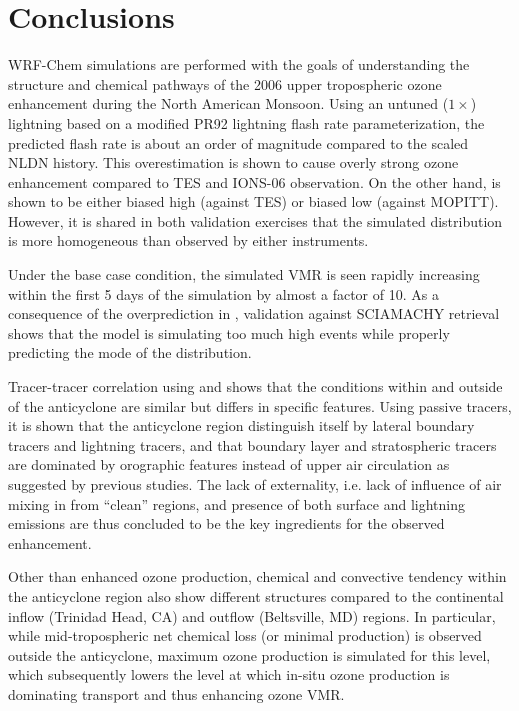 \newpage\section{Conclusions}\label{sec:2006/conslusion}

WRF-Chem simulations are performed with the goals of understanding the structure and chemical pathways of
the 2006 upper tropospheric ozone enhancement during the North American Monsoon. Using an untuned ($1\times$)
lightning based on a modified PR92 lightning flash rate parameterization, the predicted flash rate is about an order
of magnitude compared to the scaled NLDN history. This overestimation is shown to cause overly strong ozone
enhancement compared to TES and IONS-06 observation. On the other hand,  is shown to be either
biased high (against TES) or biased low (against MOPITT). However, it is shared in both validation exercises that
the simulated  distribution is more homogeneous than observed by either instruments.

Under the base case condition, the simulated  VMR is seen rapidly increasing within the first 5
days of the simulation by almost a factor of 10. As a consequence of the overprediction in {\lnox}, validation
against SCIAMACHY  retrieval shows that the model is simulating too much high 
events while properly predicting the mode of the distribution.

Tracer-tracer correlation using  and  shows that the conditions within and outside of the
anticyclone are similar but differs in specific features. Using passive tracers, it is shown that the anticyclone region
distinguish itself by lateral boundary tracers and lightning tracers, and that boundary layer and stratospheric tracers
are dominated by orographic features instead of upper air circulation as suggested by previous studies. The
lack of externality, i.e. lack of influence of air mixing in from ``clean'' regions, and presence of both surface and lightning
emissions are thus concluded to be the key ingredients for the observed enhancement.

Other than enhanced ozone production, chemical and convective tendency within the anticyclone region also
show different structures compared to the continental inflow (Trinidad Head, CA) and outflow (Beltsville, MD)
regions. In particular, while mid-tropospheric net chemical loss (or minimal production) is observed outside
the anticyclone, maximum ozone production is simulated for this level, which subsequently lowers the level
at which in-situ ozone production is dominating transport and thus enhancing ozone VMR.

